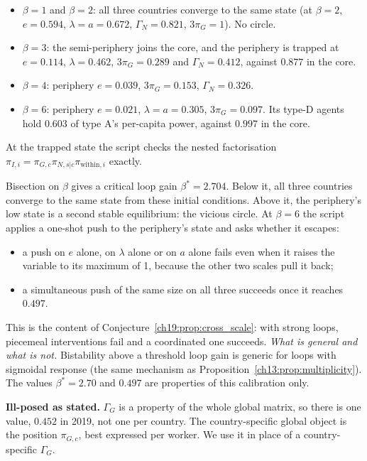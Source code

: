 \documentclass[../solutions_manual.tex]{subfiles}
\begin{document}
\begin{itemize}
\item $\beta = 1$ and $\beta = 2$: all three countries converge to the same state (at $\beta = 2$, $e = 0.594$, $\lambda = a = 0.672$, $\Gamma_N = 0.821$, $3\pi_G = 1$). No circle.
\item $\beta = 3$: the semi-periphery joins the core, and the periphery is trapped at $e = 0.114$, $\lambda = 0.462$, $3\pi_G = 0.289$ and $\Gamma_N = 0.412$, against $0.877$ in the core.
\item $\beta = 4$: periphery $e = 0.039$, $3\pi_G = 0.153$, $\Gamma_N = 0.326$.
\item $\beta = 6$: periphery $e = 0.021$, $\lambda = a = 0.305$, $3\pi_G = 0.097$. Its type-D agents hold $0.603$ of type A's per-capita power, against $0.997$ in the core.
\end{itemize}
At the trapped state the script checks the nested factorisation $\pi_{I,i} = \pi_{G,c}\pi_{N,s|c}\pi_{\text{within},i}$ exactly.

 Bisection on $\beta$ gives a critical loop gain $\beta^* = 2.704$. Below it, all three countries converge to the same state from these initial conditions. Above it, the periphery's low state is a second stable equilibrium: the vicious circle. At $\beta = 6$ the script applies a one-shot push to the periphery's state and asks whether it escapes:
\begin{itemize}
\item a push on $e$ alone, on $\lambda$ alone or on $a$ alone fails even when it raises the variable to its maximum of 1, because the other two scales pull it back;
\item a simultaneous push of the same size on all three succeeds once it reaches $0.497$.
\end{itemize}
This is the content of Conjecture~\ref{ch19:prop:cross_scale}: with strong loops, piecemeal interventions fail and a coordinated one succeeds. \emph{What is general and what is not.} Bistability above a threshold loop gain is generic for loops with sigmoidal response (the same mechanism as Proposition~\ref{ch13:prop:multiplicity}). The values $\beta^* = 2.70$ and $0.497$ are properties of this calibration only.


\textbf{Ill-posed as stated.} $\Gamma_G$ is a property of the whole global matrix, so there is one value, $0.452$ in 2019, not one per country. The country-specific global object is the position $\pi_{G,c}$, best expressed per worker. We use it in place of a country-specific $\Gamma_G$.
\end{document}

